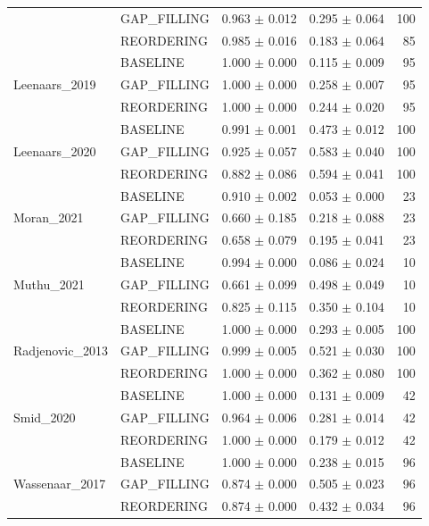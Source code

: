 \begin{table}[htbp]
\begin{tabular}{llrrr}
 & GAP_FILLING & 0.963 $\pm$ 0.012 & 0.295 $\pm$ 0.064 & 100 \\
 & REORDERING & 0.985 $\pm$ 0.016 & 0.183 $\pm$ 0.064 & 85 \\
\cline{1-5}
\multirow[t]{3}{*}{Leenaars_2019} & BASELINE & 1.000 $\pm$ 0.000 & 0.115 $\pm$ 0.009 & 95 \\
 & GAP_FILLING & 1.000 $\pm$ 0.000 & 0.258 $\pm$ 0.007 & 95 \\
 & REORDERING & 1.000 $\pm$ 0.000 & 0.244 $\pm$ 0.020 & 95 \\
\cline{1-5}
\multirow[t]{3}{*}{Leenaars_2020} & BASELINE & 0.991 $\pm$ 0.001 & 0.473 $\pm$ 0.012 & 100 \\
 & GAP_FILLING & 0.925 $\pm$ 0.057 & 0.583 $\pm$ 0.040 & 100 \\
 & REORDERING & 0.882 $\pm$ 0.086 & 0.594 $\pm$ 0.041 & 100 \\
\cline{1-5}
\multirow[t]{3}{*}{Moran_2021} & BASELINE & 0.910 $\pm$ 0.002 & 0.053 $\pm$ 0.000 & 23 \\
 & GAP_FILLING & 0.660 $\pm$ 0.185 & 0.218 $\pm$ 0.088 & 23 \\
 & REORDERING & 0.658 $\pm$ 0.079 & 0.195 $\pm$ 0.041 & 23 \\
\cline{1-5}
\multirow[t]{3}{*}{Muthu_2021} & BASELINE & 0.994 $\pm$ 0.000 & 0.086 $\pm$ 0.024 & 10 \\
 & GAP_FILLING & 0.661 $\pm$ 0.099 & 0.498 $\pm$ 0.049 & 10 \\
 & REORDERING & 0.825 $\pm$ 0.115 & 0.350 $\pm$ 0.104 & 10 \\
\cline{1-5}
\multirow[t]{3}{*}{Radjenovic_2013} & BASELINE & 1.000 $\pm$ 0.000 & 0.293 $\pm$ 0.005 & 100 \\
 & GAP_FILLING & 0.999 $\pm$ 0.005 & 0.521 $\pm$ 0.030 & 100 \\
 & REORDERING & 1.000 $\pm$ 0.000 & 0.362 $\pm$ 0.080 & 100 \\
\cline{1-5}
\multirow[t]{3}{*}{Smid_2020} & BASELINE & 1.000 $\pm$ 0.000 & 0.131 $\pm$ 0.009 & 42 \\
 & GAP_FILLING & 0.964 $\pm$ 0.006 & 0.281 $\pm$ 0.014 & 42 \\
 & REORDERING & 1.000 $\pm$ 0.000 & 0.179 $\pm$ 0.012 & 42 \\
\cline{1-5}
\multirow[t]{3}{*}{Wassenaar_2017} & BASELINE & 1.000 $\pm$ 0.000 & 0.238 $\pm$ 0.015 & 96 \\
 & GAP_FILLING & 0.874 $\pm$ 0.000 & 0.505 $\pm$ 0.023 & 96 \\
 & REORDERING & 0.874 $\pm$ 0.000 & 0.432 $\pm$ 0.034 & 96 \\

\end{tabular}
\end{table}
